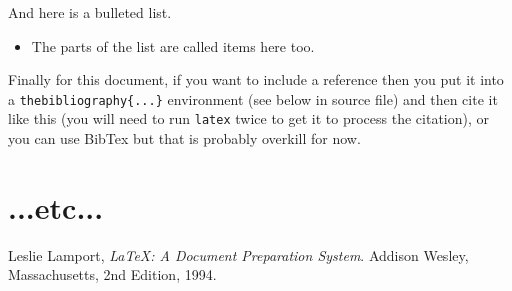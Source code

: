 \documentclass[a4wide, 11pt]{article}
\begin{document}
And here is a bulleted list.

\begin{itemize}

    \item
    The parts of the list are called items here too.
    
\end{itemize}

Finally for this document, if you want to include a reference
then you put it into a \texttt{thebibliography\{...\}}
environment (see below in source file) and then 
cite it like this \cite{lamport94}
(you will need to run \texttt{latex} twice to get it to process the citation),
or you can use BibTex but that is probably overkill for now.

\section{...etc...}

\begin{thebibliography}{9}

  Leslie Lamport,
  \emph{\LaTeX: A Document Preparation System}.
  Addison Wesley, Massachusetts,
  2nd Edition,
  1994.

\end{thebibliography}
\end{document}
